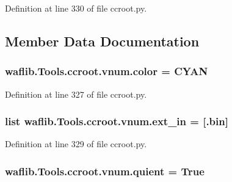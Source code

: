 Definition at line 330 of file ccroot.\+py.



\subsection{Member Data Documentation}
\subsubsection[{\texorpdfstring{color}{color}}]{ waflib.\+Tools.\+ccroot.\+vnum.\+color = \textquotesingle{}C\+Y\+AN\textquotesingle{}\hspace{0.3cm}{\ttfamily [static]}}\hypertarget{classwaflib_1_1_tools_1_1ccroot_1_1vnum_a57f2f844f70c699cf616a56d147356bc}{}\label{classwaflib_1_1_tools_1_1ccroot_1_1vnum_a57f2f844f70c699cf616a56d147356bc}


Definition at line 327 of file ccroot.\+py.

\subsubsection[{\texorpdfstring{ext\+\_\+in}{ext_in}}]{\setlength{\rightskip}{0pt plus 5cm}list waflib.\+Tools.\+ccroot.\+vnum.\+ext\+\_\+in = \mbox{[}\textquotesingle{}.bin\textquotesingle{}\mbox{]}\hspace{0.3cm}{\ttfamily [static]}}\hypertarget{classwaflib_1_1_tools_1_1ccroot_1_1vnum_ab93191a4f3b22c1ceb8ceb7d2eaff68d}{}\label{classwaflib_1_1_tools_1_1ccroot_1_1vnum_ab93191a4f3b22c1ceb8ceb7d2eaff68d}


Definition at line 329 of file ccroot.\+py.

\subsubsection[{\texorpdfstring{quient}{quient}}]{ waflib.\+Tools.\+ccroot.\+vnum.\+quient = True\hspace{0.3cm}{\ttfamily [static]}}\hypertarget{classwaflib_1_1_tools_1_1ccroot_1_1vnum_ace811c25fcaf6f27bf45dc6043611b50}{}\label{classwaflib_1_1_tools_1_1ccroot_1_1vnum_ace811c25fcaf6f27bf45dc6043611b50}


